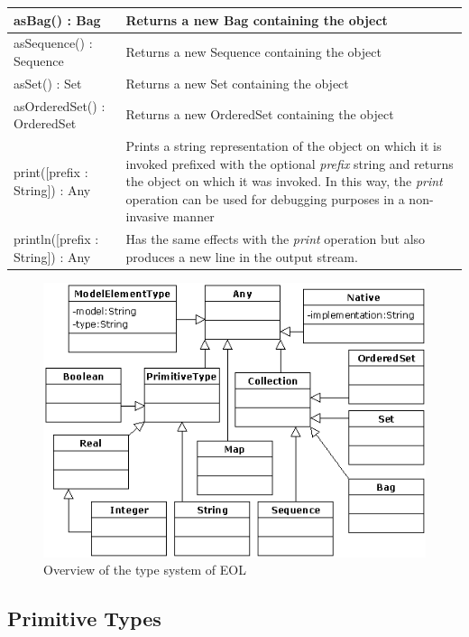 \begin{longtable} {|p{5.5cm}|p{6.5cm}|}
			asBag() : Bag & Returns a new Bag containing the object \\\hline
			
			asSequence() : Sequence & Returns a new Sequence containing the object \\\hline
			
			asSet() : Set & Returns a new Set containing the object \\\hline
			
			asOrderedSet() : OrderedSet & Returns a new OrderedSet containing the object \\\hline
			
			print([prefix : String]) : Any & Prints a string representation of the object on which it is invoked prefixed with the optional \emph{prefix} string and returns the object on which it was invoked. In this way, the \emph{print} operation can be used for debugging purposes in a non-invasive manner\\\hline
			
			println([prefix : String]) : Any & Has the same effects with the \emph{print} operation but also produces a new line in the output stream. \\\hline

\end{longtable}

\clearpage

\begin{figure}
	\centering
		\includegraphics{images/EOLTypes.png}
	\caption{Overview of the type system of EOL}
	\label{fig:EOLTypes}
\end{figure}

\subsection{Primitive Types} 

